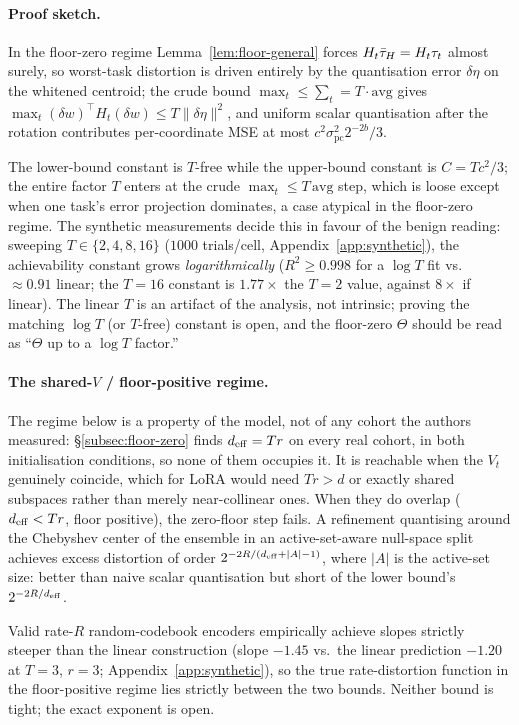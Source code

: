 \paragraph{Proof sketch.} In the floor-zero regime
Lemma~\ref{lem:floor-general} forces $H_t\bar{\tau}_H = H_t\tau_t$ almost
surely, so worst-task distortion is driven entirely by the quantisation
error $\delta\eta$ on the whitened centroid; the crude bound
$\max_t \leq \sum_t = T\cdot\mathrm{avg}$ gives
$\max_t(\delta w)^\top H_t(\delta w) \leq T\|\delta\eta\|^2$, and
uniform scalar quantisation after the rotation contributes
per-coordinate MSE at most $c^2\sigma_{\mathrm{pc}}^2 2^{-2b}/3$.

\begin{remark}
\label{rem:tgap}
The lower-bound constant is $T$-free while the upper-bound constant is
$C = Tc^2/3$; the entire factor $T$ enters at the crude
$\max_t \leq T\,\mathrm{avg}$ step, which is loose except when one
task's error projection dominates, a case atypical in the floor-zero
regime. The synthetic measurements decide this in favour of the benign
reading: sweeping $T \in \{2,4,8,16\}$ ($1000$ trials/cell,
Appendix~\ref{app:synthetic}), the achievability constant grows
\emph{logarithmically} ($R^2 \geq 0.998$ for a $\log T$ fit vs.\
$\approx 0.91$ linear; the $T{=}16$ constant is $1.77\times$ the
$T{=}2$ value, against $8\times$ if linear). The linear $T$ is an
artifact of the analysis, not intrinsic; proving the matching $\log T$
(or $T$-free) constant is open, and the floor-zero $\Theta$ should be
read as ``$\Theta$ up to a $\log T$ factor.''
\end{remark}

\paragraph{The shared-$V$ / floor-positive regime.}\label{subsec:sharedv}
The regime below is a property of the model, not of any cohort the authors
measured: \S\ref{subsec:floor-zero} finds $d_{\mathrm{eff}} = Tr$ on every real
cohort, in both initialisation conditions, so none of them occupies it.
It is reachable when the $V_t$ genuinely coincide, which for LoRA would
need $Tr > d$ or exactly shared subspaces rather than merely
near-collinear ones. When they do overlap ($d_{\mathrm{eff}} < Tr$, floor positive),
the zero-floor step fails. A refinement quantising around the Chebyshev center of the
ensemble in an active-set-aware null-space split achieves excess
distortion of order $2^{-2R/(d_{\mathrm{eff}} + |A| - 1)}$, where $|A|$ is the
active-set size: better than naive scalar quantisation but short of
the lower bound's $2^{-2R/d_{\mathrm{eff}}}$.

\begin{remark}\label{rem:sharedv-gap}
Valid rate-$R$ random-codebook encoders empirically achieve slopes
strictly steeper than the linear construction (slope $-1.45$ vs.\ the
linear prediction $-1.20$ at $T = 3$, $r = 3$;
Appendix~\ref{app:synthetic}), so the true rate-distortion function in
the floor-positive regime lies strictly between the two bounds. Neither
bound is tight; the exact exponent is open.
\end{remark}
